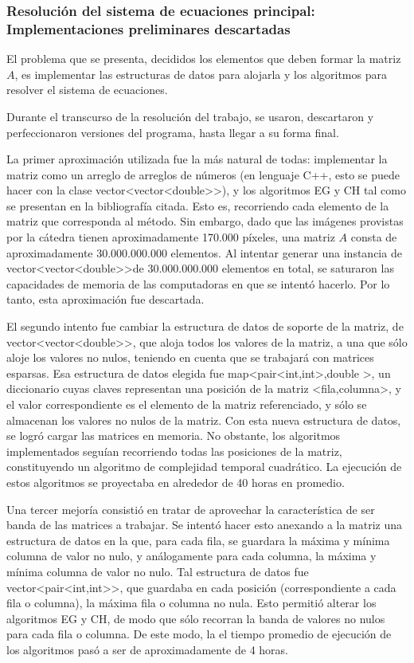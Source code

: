 \subsubsection {Resoluci\'on del sistema de ecuaciones principal: 
Implementaciones preliminares descartadas}

El problema que se presenta, decididos los elementos que deben formar la matriz $A$, es implementar las estructuras de datos para alojarla y los algoritmos para resolver el sistema de ecuaciones.

Durante el transcurso de la resoluci\'on del trabajo, se usaron, descartaron y perfeccionaron versiones del programa, hasta llegar a su forma final.

La primer aproximaci\'on utilizada fue la m\'as natural de todas: implementar la matriz como un arreglo de arreglos de números (en lenguaje C++, esto se puede hacer con la clase vector<vector<double\textgreater\textgreater), y los algoritmos EG y CH tal como se presentan en la bibliografía citada. Esto es, recorriendo cada elemento de la matriz que corresponda al método. 
Sin embargo, dado que las imágenes provistas por la cátedra tienen aproximadamente 170.000 píxeles, una matriz $A$ consta de aproximadamente 30.000.000.000 elementos. Al intentar generar una instancia de vector<vector<double\textgreater\textgreater de 30.000.000.000 elementos en total, se saturaron las capacidades de memoria de las computadoras en que se intentó hacerlo.
Por lo tanto, esta aproximación fue descartada.

El segundo intento fue cambiar la estructura de datos de soporte de la matriz, de vector<vector<double\textgreater\textgreater, que aloja todos los valores de la matriz, a una que sólo aloje los valores no nulos, teniendo en cuenta que se trabajará con matrices esparsas. Esa estructura de datos elegida fue map<pair<int,int\textgreater ,double \textgreater, un diccionario cuyas claves representan una posición de la matriz <fila,columna\textgreater, y el valor correspondiente es el elemento de la matriz referenciado, y sólo se almacenan los valores no nulos de la matriz.
Con esta nueva estructura de datos, se logró cargar las matrices en memoria. No obstante, los algoritmos implementados seguían recorriendo todas las posiciones de la matriz, constituyendo un algoritmo de complejidad temporal cuadrático. La ejecución de estos algoritmos se proyectaba en alrededor de 40 horas en promedio.

Una tercer mejoría consistió en tratar de aprovechar la característica de ser banda de las matrices a trabajar. Se intentó hacer esto anexando a la matriz una estructura de datos en la que, para cada fila, se guardara la máxima y mínima columna de valor no nulo, y análogamente para cada columna, la máxima y mínima columna de valor no nulo. Tal estructura de datos fue vector<pair<int,int\textgreater\textgreater, que guardaba en cada posición (correspondiente a cada fila o columna), la máxima fila o columna no nula. Esto permitió alterar los algoritmos EG y CH, de modo que sólo recorran la banda de valores no nulos para cada fila o columna. De este modo, la el tiempo promedio de ejecución de los algoritmos pasó a ser de aproximadamente de 4 horas.


